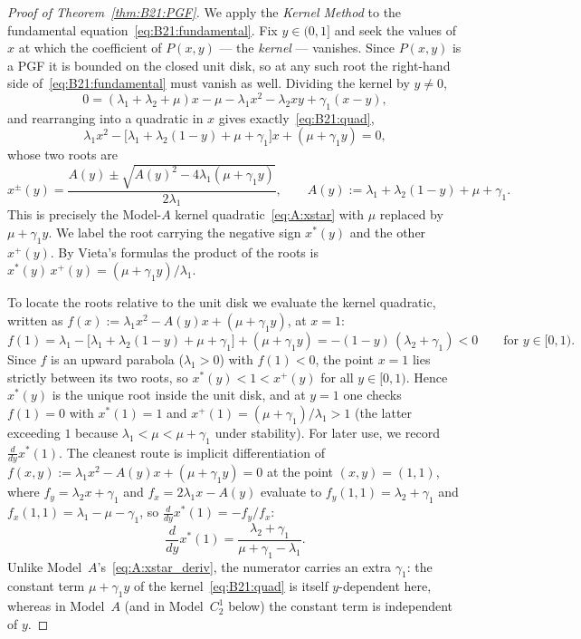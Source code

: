 \begin{proof}[Proof of Theorem~\ref{thm:B21:PGF}]
We apply the \emph{Kernel Method} to the fundamental equation~\eqref{eq:B21:fundamental}.
Fix $y\in(0,1]$ and seek the values of $x$ at which the coefficient of $P(x,y)$ --- the
\emph{kernel} --- vanishes. Since $P(x,y)$ is a PGF it is bounded on the closed unit disk,
so at any such root the right-hand side of~\eqref{eq:B21:fundamental} must vanish as well.
Dividing the kernel by $y\ne0$,
\begin{equation*}
    0 = (\lambda_1+\lambda_2+\mu)x - \mu - \lambda_1 x^2 - \lambda_2 xy + \gamma_1(x-y),
\end{equation*}
and rearranging into a quadratic in $x$ gives exactly~\eqref{eq:B21:quad},
\begin{equation*}
    \lambda_1 x^2 - \bigl[\lambda_1+\lambda_2(1-y)+\mu+\gamma_1\bigr]x + (\mu+\gamma_1 y) = 0,
\end{equation*}
whose two roots are
\begin{equation}
    x^{\pm}(y) = \frac{A(y) \pm \sqrt{A(y)^2 - 4\lambda_1(\mu+\gamma_1 y)}}{2\lambda_1},
    \qquad A(y):=\lambda_1+\lambda_2(1-y)+\mu+\gamma_1.
    \label{eq:B21:xstar}
\end{equation}
This is precisely the Model-$A$ kernel quadratic~\eqref{eq:A:xstar} with $\mu$ replaced by
$\mu+\gamma_1 y$. We label the root carrying the negative sign $x^*(y)$ and the other
$x^+(y)$. By Vieta's formulas the product of the roots is
$x^*(y)\,x^+(y)=(\mu+\gamma_1 y)/\lambda_1$.

To locate the roots relative to the unit disk we evaluate the kernel quadratic, written as
$f(x):=\lambda_1 x^2 - A(y)x + (\mu+\gamma_1 y)$, at $x=1$:
\begin{equation*}
    f(1) = \lambda_1 - \bigl[\lambda_1+\lambda_2(1-y)+\mu+\gamma_1\bigr] + (\mu+\gamma_1 y)
         = -(1-y)\,(\lambda_2+\gamma_1) < 0
    \qquad\text{for } y\in[0,1).
\end{equation*}
Since $f$ is an upward parabola ($\lambda_1>0$) with $f(1)<0$, the point $x=1$ lies strictly
between its two roots, so $x^*(y)<1<x^+(y)$ for all $y\in[0,1)$. Hence $x^*(y)$ is the unique
root inside the unit disk, and at $y=1$ one checks $f(1)=0$ with $x^*(1)=1$ and
$x^+(1)=(\mu+\gamma_1)/\lambda_1>1$ (the latter exceeding $1$ because
$\lambda_1<\mu<\mu+\gamma_1$ under stability). For later use, we record
$\tfrac{d}{dy}x^*(1)$. The cleanest route is implicit differentiation of
$f(x,y):=\lambda_1 x^2-A(y)x+(\mu+\gamma_1 y)=0$ at the point $(x,y)=(1,1)$, where
$f_y=\lambda_2 x+\gamma_1$ and $f_x=2\lambda_1 x-A(y)$ evaluate to
$f_y(1,1)=\lambda_2+\gamma_1$ and $f_x(1,1)=\lambda_1-\mu-\gamma_1$, so
$\tfrac{d}{dy}x^*(1)=-f_y/f_x$:
\begin{equation}
    \frac{d}{dy}x^*(1) = \frac{\lambda_2+\gamma_1}{\mu+\gamma_1-\lambda_1}.
    \label{eq:B21:xstar_deriv}
\end{equation}
Unlike Model~$A$'s~\eqref{eq:A:xstar_deriv}, the numerator carries an extra $\gamma_1$:
the constant term $\mu+\gamma_1 y$ of the kernel~\eqref{eq:B21:quad} is itself
$y$-dependent here, whereas in Model~$A$ (and in Model~$C_2^1$ below) the constant term is
independent of $y$.


\end{proof}
